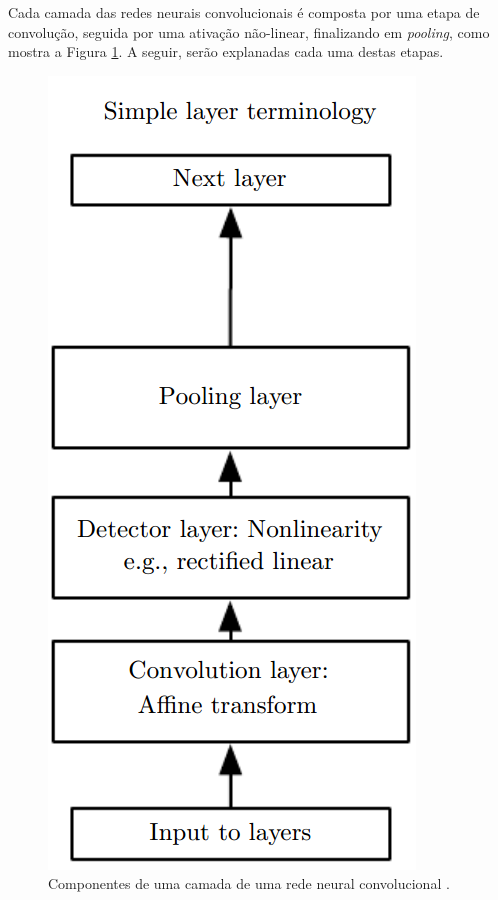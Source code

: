 
Cada camada das redes neurais convolucionais é composta por uma etapa de convolução, seguida por uma ativação não-linear, finalizando em \emph{pooling}, como mostra a Figura \ref{fig:cnn_camada}. A seguir, serão explanadas cada uma destas etapas. 

\begin{figure}
	\centering
	\includegraphics[height=0.5\textheight]{img/cnn_camada.png}
	\caption{Componentes de uma camada de uma rede neural convolucional \cite{goodfellow2016deep}. }
	\label{fig:cnn_camada}
\end{figure}


